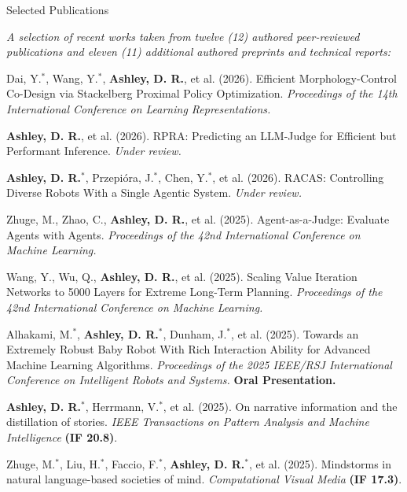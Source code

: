 \documentclass[letterpaper,dateabbrev,compact]{cv}
\begin{document}

\begin{rSection}{Selected Publications}

\textit{A selection of recent works taken from twelve (12) authored peer-reviewed publications and eleven (11) additional authored preprints and technical reports:}
\vspace{0.25em}
\begin{rSelectedPublications}
    \item
        Dai, Y.$^*$, Wang, Y.$^*$, \textbf{Ashley, D. R.}, et al.
        (2026).
        Efficient Morphology-Control Co-Design via Stackelberg Proximal Policy Optimization.
        \textit{Proceedings of the 14th International Conference on Learning Representations.}
    \item
        \textbf{Ashley, D. R.}, et al.
        (2026).
        RPRA: Predicting an LLM-Judge for Efficient but Performant Inference.
        \textit{Under review.}
    \item
        \textbf{Ashley, D. R.}$^*$, Przepi{\'{o}}ra, J.$^*$, Chen, Y.$^*$, et al.
        (2026).
        RACAS: Controlling Diverse Robots With a Single Agentic System.
        \textit{Under review.}
    \item
        Zhuge, M., Zhao, C., \textbf{Ashley, D. R.}, et al.
        (2025).
        Agent-as-a-Judge: Evaluate Agents with Agents.
        \textit{Proceedings of the 42nd International Conference on Machine Learning.}
    \item
        Wang, Y., Wu, Q., \textbf{Ashley, D. R.}, et al.
        (2025).
        Scaling Value Iteration Networks to 5000 Layers for Extreme Long-Term Planning.
        \textit{Proceedings of the 42nd International Conference on Machine Learning.}
    \item
        Alhakami, M.$^*$, \textbf{Ashley, D. R.}$^*$, Dunham, J.$^*$, et al.
        (2025).
        Towards an Extremely Robust Baby Robot With Rich Interaction Ability for Advanced Machine Learning Algorithms.
        \textit{Proceedings of the 2025 IEEE/RSJ International Conference on Intelligent Robots and Systems.}
        \textbf{Oral Presentation.}
    \item
        \textbf{Ashley, D. R.}$^*$, Herrmann, V.$^*$, et al.
        (2025).
        On narrative information and the distillation of stories.
        \textit{IEEE Transactions on Pattern Analysis and Machine Intelligence} \textbf{(IF 20.8)}.
    \item
        Zhuge, M.$^*$, Liu, H.$^*$, Faccio, F.$^*$, \textbf{Ashley, D. R.}$^*$, et al.
        (2025).
        Mindstorms in natural language-based societies of mind.
        \textit{Computational Visual Media} \textbf{(IF 17.3)}.
\end{rSelectedPublications}

\end{rSection}
\end{document}
